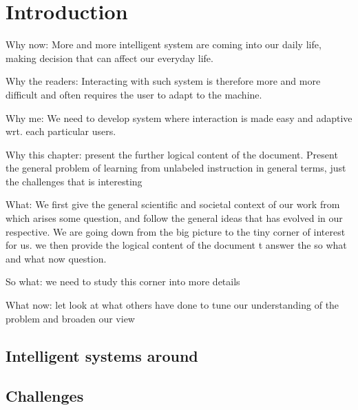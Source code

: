 \renewcommand{\chapterpath}{chapter1}
\renewcommand{\imgpath}{\chapterpath/img}

\chapter{Introduction}
\label{chapter:Introduction}
\minitoc

Why now: More and more intelligent system are coming into our daily life, making decision that can affect our everyday life. 

Why the readers: Interacting with such system is therefore more and more difficult and often requires the user to adapt to the machine.

Why me: We need to develop system where interaction is made easy and adaptive wrt. each particular users. 

Why this chapter: present the further logical content of the document. Present the general problem of learning from unlabeled instruction in general terms, just the challenges that is interesting 

What: We first give the general scientific and societal context of our work from which arises some question, and follow the general ideas that has evolved in our respective. We are going down from the big picture to the tiny corner of interest for us. we then provide the logical content of the document t answer the so what and what now question.

So what: we need to study this corner into more details

What now: let look at what others have done to tune our understanding of the problem and broaden our view

\section{Intelligent systems around}


\section{Challenges}

